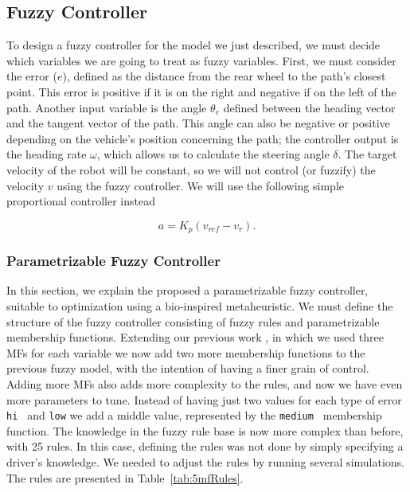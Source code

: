 \documentclass[symmetry,article,submit,moreauthors,pdftex]{Definitions/mdpi}
\begin{document}
\subsection{Fuzzy Controller}%
    \label{sub:FuzzyControllers}

To design a fuzzy controller for the model we just described, we must decide which 
variables we are going to treat as fuzzy variables. 
First, we must consider the error ($e$), defined as the distance from the rear wheel to the
path's closest point. This error is positive if it is on the right and
negative if on the left of the path. Another input variable is the angle
$\theta_e$ defined between the heading vector and the tangent vector of the
path. This angle can also be negative or positive depending on the vehicle's
position concerning the path; the controller output is the heading rate
$\omega$, which allows us to calculate the steering angle $\delta$. The target
velocity of the robot will be constant, so we will not control (or fuzzify) the
velocity $v$ using the fuzzy controller. We will use the following simple
proportional controller instead

\begin{equation}
    a = K_p(v_{ref}-v_r).
\end{equation}

\subsubsection{Parametrizable Fuzzy Controller}
In this section, we explain the proposed a parametrizable fuzzy controller,
suitable to optimization using a bio-inspired metaheuristic. We must define 
the structure of the fuzzy controller consisting of fuzzy rules and parametrizable 
membership functions.
Extending our previous work \cite{Mancilla2021}, in which we used three MFs for each 
variable we now add two more 
membership functions to the previous fuzzy model, with the intention
of having a finer grain of control. Adding more MFs also adds more
complexity to the rules, and now we have even more parameters to tune.  Instead
of having just two values for each type of error { \tt hi } and {\tt low} we
add a middle value, represented by the { \tt medium } membership function. The
knowledge in the fuzzy rule base is now more complex than before, with 25
rules. In this case, defining the rules was not done by simply specifying a
driver's knowledge. We needed to adjust the rules by running several
simulations. The rules are presented in Table~\ref{tab:5mfRules}.
\end{document}
